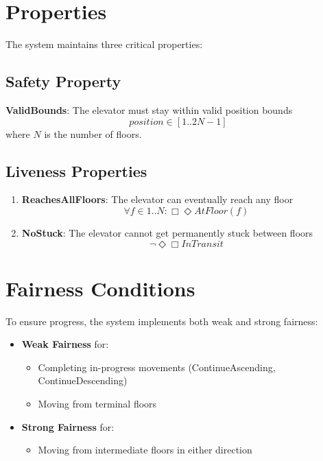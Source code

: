 \documentclass{article}
\begin{document}
\section{Properties}
The system maintains three critical properties:

\subsection{Safety Property}
\textbf{ValidBounds}: The elevator must stay within valid position bounds
\[ position \in [1..2N-1] \]
where $N$ is the number of floors.

\subsection{Liveness Properties}
\begin{enumerate}
    \item \textbf{ReachesAllFloors}: The elevator can eventually reach any floor
    \[ \forall f \in 1..N : \Box\Diamond AtFloor(f) \]
    
    \item \textbf{NoStuck}: The elevator cannot get permanently stuck between floors
    \[ \neg\Diamond\Box InTransit \]
\end{enumerate}

\section{Fairness Conditions}
To ensure progress, the system implements both weak and strong fairness:
\begin{itemize}
    \item \textbf{Weak Fairness} for:
    \begin{itemize}
        \item Completing in-progress movements (ContinueAscending, ContinueDescending)
        \item Moving from terminal floors
    \end{itemize}
    \item \textbf{Strong Fairness} for:
    \begin{itemize}
        \item Moving from intermediate floors in either direction
    \end{itemize}
\end{itemize}
\end{document}
